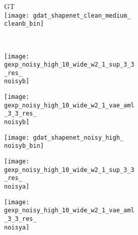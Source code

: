 \begin{figure}[t]
{\begin{subfigure}[t]{0.5\textwidth}
\begin{subfigure}[t]{0.15\textwidth}
        \end{subfigure}
        \begin{subfigure}[t]{0.15\textwidth}
            \vspace{0px}\centering
            GT\\
            \texttt{[image: gdat\_shapenet\_clean\_medium\_\\cleanb\_bin]}
        \end{subfigure}
        \\[2px]
        \hspace*{-6px}
        \begin{subfigure}[t]{0.15\textwidth}
            \vspace{0px}\centering
            \texttt{[image: gexp\_noisy\_high\_10\_wide\_w2\_1\_sup\_3\_3\_res\_\\noisyb]}
        \end{subfigure}
        \begin{subfigure}[t]{0.15\textwidth}
        	\vspace{0px}\centering
        	\texttt{[image: gexp\_noisy\_high\_10\_wide\_w2\_1\_vae\_aml\_3\_3\_res\_\\noisyb]}
        \end{subfigure}
        \begin{subfigure}[t]{0.15\textwidth}
            \vspace{0px}\centering
            \texttt{[image: gdat\_shapenet\_noisy\_high\_\\noisyb\_bin]}
        \end{subfigure}
        \begin{subfigure}[t]{0.15\textwidth}
            \vspace{0px}\centering
            \texttt{[image: gexp\_noisy\_high\_10\_wide\_w2\_1\_sup\_3\_3\_res\_\\noisya]}
        \end{subfigure}
        \begin{subfigure}[t]{0.15\textwidth}
            \vspace{0px}\centering
            \texttt{[image: gexp\_noisy\_high\_10\_wide\_w2\_1\_vae\_aml\_3\_3\_res\_\\noisya]}
        \end{subfigure}
        \begin{subfigure}[t]{0.15\textwidth}

\end{subfigure}
\end{subfigure}}
\end{figure}
